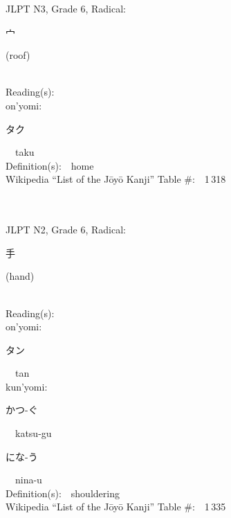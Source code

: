 \begin{multicols}{2}
{JLPT N3, Grade 6, Radical:\ \ {\begin{CJK}{UTF8}{min} 宀 \end{CJK}} (roof) } \\
Reading(s):\ \ \\
{\hspace*{1em}}on'yomi:\ \ \\
{\hspace*{2em}}{\begin{CJK}{UTF8}{min} タク \end{CJK}}\ \ taku\ \ \\
Definition(s):\ \ home \\
Wikipedia ``List of the J\=oy\=o Kanji'' Table \#:\ \ 1\,318 \\
\ \ \\
{\fontsize{34pt}{40pt}  }\ \ \\  %
{JLPT N2, Grade 6, Radical:\ \ {\begin{CJK}{UTF8}{min} 手 \end{CJK}} (hand) } \\
Reading(s):\ \ \\
{\hspace*{1em}}on'yomi:\ \ \\
{\hspace*{2em}}{\begin{CJK}{UTF8}{min} タン \end{CJK}}\ \ tan\ \ \\
{\hspace*{1em}}kun'yomi:\ \ \\
{\hspace*{2em}}{\begin{CJK}{UTF8}{min} かつ-ぐ \end{CJK}}\ \ katsu-gu\ \ \\
{\hspace*{2em}}{\begin{CJK}{UTF8}{min} にな-う \end{CJK}}\ \ nina-u\ \ \\
Definition(s):\ \ shouldering \\
Wikipedia ``List of the J\=oy\=o Kanji'' Table \#:\ \ 1\,335 \\
\ \ \\
{\fontsize{34pt}{40pt}  }\ \ \\  %

\end{multicols}
